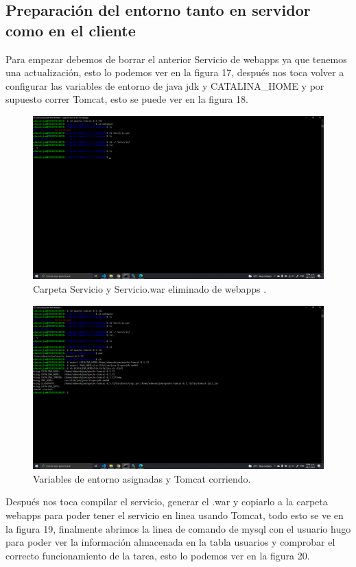 \documentclass[11pt]{article}
\begin{document}
	\subsection{Preparación del entorno tanto en servidor como en el cliente}		
	Para empezar debemos de borrar el anterior Servicio de webapps ya que tenemos una actualización, esto lo podemos ver en la figura 17, después nos toca volver a configurar las variables de entorno de java jdk y CATALINA\_HOME y por supuesto correr Tomcat, esto se puede ver en la figura 18.
	\begin{figure}[H]
			\centering
			\includegraphics[scale=0.34]{resources/sreviciodelete.png}
			\caption{Carpeta Servicio y Servicio.war eliminado de webapps .}\label{fig:picture}
		\end{figure}
		\begin{figure}[H]
			\centering
			\includegraphics[scale=0.34]{resources/tomcatready.png}
			\caption{Variables de entorno asignadas y Tomcat corriendo.}\label{fig:picture}
		\end{figure}
		Después nos toca compilar el servicio, generar el .war y copiarlo a la carpeta webapps para poder tener el servicio en linea usando Tomcat, todo esto se ve en la figura 19, finalmente abrimos la linea de comando de mysql con el usuario hugo para poder ver la información almacenada en la tabla usuarios y comprobar el correcto funcionamiento de la tarea, esto lo podemos ver en la figura 20.
\end{document}
